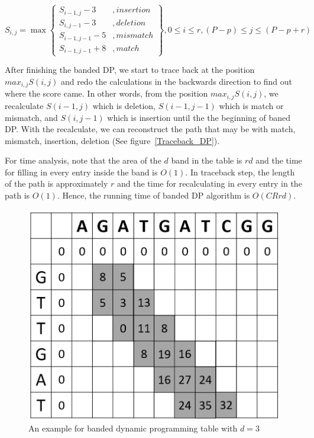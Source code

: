 \vspace{6pt}
$S_{i,j} = \max \left\{\begin{matrix} S_{i-1, j} - 3 &, insertion\\
S_{i, j-1} - 3 &, deletion\\
S_{i-1, j-1} - 5 &, mismatch\\
S_{i-1, j-1} + 8 &, match \end{matrix}\right\}, 0 \leq i \leq r, (P-p) \leq j \leq (P-p+r)$ 

After finishing the banded DP, we start to trace back at the position $max_{i,j}S(i,j)$ and redo the calculations in the backwards direction to find out where the score came. In other words, from the position $max_{i,j}S(i,j)$, we recalculate $S(i-1,j)$ which is deletion, $S(i-1,j-1)$ which is match or mismatch, and $S(i,j-1)$ which is insertion until the the beginning of baned DP. With the recalculate, we can reconstruct the path that may be with match, mismatch, insertion, deletion (See figure~\ref{Traceback_DP}).


For time analysis, note that the area of the $d$ band in the table is $rd$ and the time for filling in every entry inside the band is $O(1)$. In traceback step, the length of the path is approximately $r$ and the time for recalculating in every entry in the path is $O(1)$. Hence, the running time of banded DP algorithm is $O(CRrd)$.

\begin{figure} [h]
\centering
\includegraphics[scale=0.35]{Figures/chapter3/banded_DP_table_with_d3.png}
\caption{An example for banded dynamic programming table with $d=3$}
\label{banded_DP_table_with_d3}
\end{figure}

